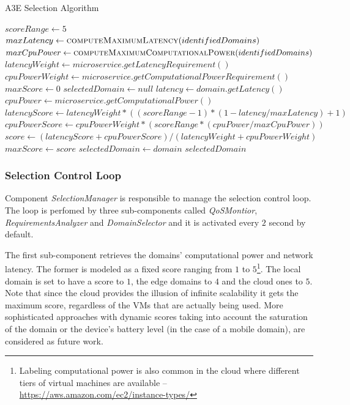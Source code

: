 \begin{algorithm}[b]
	\caption{A3E Selection Algorithm}
	\label{alg:selection}
	\begin{algorithmic}[1]
		
		\State$scoreRange \gets 5$
		\State $maxLatency \gets \Call{computeMaximumLatency}{identifiedDomains}$
		\State $maxCpuPower \gets \Call{computeMaximumComputationalPower}{identifiedDomains}$
		\State $latencyWeight \gets microservice.getLatencyRequirement()$ 
		\State $cpuPowerWeight \gets microservice.getComputationalPowerRequirement()$ 
		\State $maxScore \gets 0$
		\State $selectedDomain \gets null$
		\State $latency \gets domain.getLatency()$ 
		\State $cpuPower \gets microservice.getComputationalPower()$ 
		\State $latencyScore \gets latencyWeight*((scoreRange-1)*(1 - latency/maxLatency)+1)$ 
		\State $cpuPowerScore \gets cpuPowerWeight*(scoreRange*(cpuPower/maxCpuPower))$
		\State $score \gets (latencyScore + cpuPowerScore) / (latencyWeight + cpuPowerWeight)$
		\State $maxScore \gets score$
		\State $selectedDomain \gets domain$
		\EndIf
		\EndFor 
		\State \Return $selectedDomain$
		\EndFunction
	\end{algorithmic}
\end{algorithm}

\subsubsection{Selection Control Loop}

Component \textit{SelectionManager} is responsible to manage the selection control loop. The loop is perfomed by three sub-components called \textit{QoSMontior}, \textit{RequirementsAnalyzer} and \textit{DomainSelector} and it is activated every $2$ second by default.

The first sub-component retrieves the domains' computational power and network latency. The former is modeled as a fixed score ranging from $1$ to $5$\footnote{Labeling computational power is also common in the cloud where different tiers of virtual machines are available -- \url{https://aws.amazon.com/ec2/instance-types/}}. The local domain is set to have a score to $1$, the edge domains to $4$ and the cloud ones to $5$. Note that since the cloud provides the illusion of infinite scalability it gets the maximum score, regardless of the VMs that are actually being used. More sophisticated approaches with dynamic scores taking into account the saturation of the domain or the device's battery level (in the case of a mobile domain), are considered as future work.  
 
